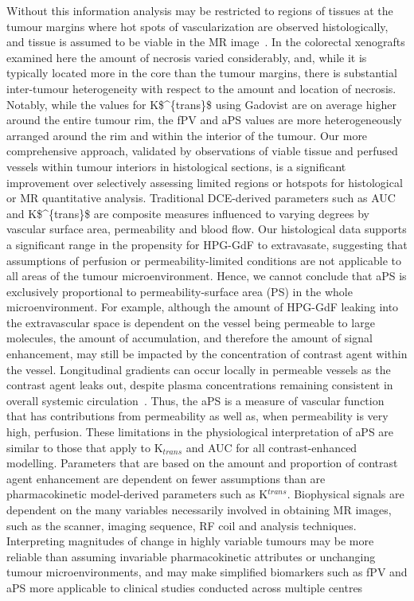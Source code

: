 Without this information analysis may be restricted to regions of tissues at the tumour margins where hot spots of vascularization are observed histologically, and tissue is assumed to be viable in the MR image~\cite{Pathak:2005gu,Li:2005gw}.
In the colorectal xenografts examined here the amount of necrosis varied considerably, and, while it is typically located more in the core than the tumour margins, there is substantial inter-tumour heterogeneity with respect to the amount and location of necrosis.
Notably, while the values for \acs{K$^{trans}$} using Gadovist are on average higher around the entire tumour rim, the \acs{fPV} and \acs{aPS} values are more heterogeneously arranged around the rim and within the interior of the tumour.
Our more comprehensive approach, validated by observations of viable tissue and perfused vessels within tumour interiors in histological sections, is a significant improvement over selectively assessing limited regions or hotspots for histological or MR quantitative analysis.
Traditional DCE-derived parameters such as \acs{AUC} and \acs{K$^{trans}$} are composite measures influenced to varying degrees by vascular surface area, permeability and blood flow.
Our histological data supports a significant range in the propensity for \acs{HPG-GdF} to extravasate, suggesting that assumptions of perfusion or permeability-limited conditions are not applicable to all areas of the tumour microenvironment.
Hence, we cannot conclude that \acs{aPS} is exclusively proportional to permeability-surface area (PS) in the whole microenvironment.
For example, although the amount of \acs{HPG-GdF} leaking into the extravascular space is dependent on the vessel being permeable to large molecules, the amount of accumulation, and therefore the amount of signal enhancement, may still be impacted by the concentration of contrast agent within the vessel.
Longitudinal gradients can occur locally in permeable vessels as the contrast agent leaks out, despite plasma concentrations remaining consistent in overall systemic circulation~\cite{Erickson:2003wt,Dewhirst:1999jh}.
Thus, the \acs{aPS} is a measure of vascular function that has contributions from permeability as well as, when permeability is very high, perfusion.
These limitations in the physiological interpretation of \acs{aPS} are similar to those that apply to K$_{trans}$ and \acs{AUC} for all contrast-enhanced modelling.
Parameters that are based on the amount and proportion of contrast agent enhancement are dependent on fewer assumptions than are pharmacokinetic model-derived parameters such as K$^{trans}$.
Biophysical signals are dependent on the many variables necessarily involved in obtaining MR images, such as the scanner, imaging sequence, RF coil and analysis techniques.
Interpreting magnitudes of change in highly variable tumours may be more reliable than assuming invariable pharmacokinetic attributes or unchanging tumour microenvironments, and may make simplified biomarkers such as \acs{fPV} and \acs{aPS} more applicable to clinical studies conducted across multiple centres~\cite{OConnor:2012ie}

